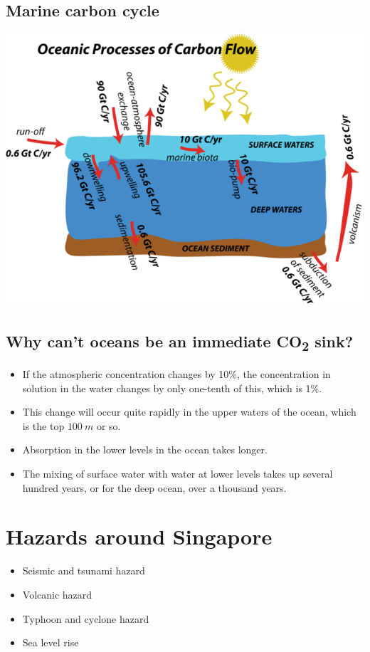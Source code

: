 \documentclass[11pt]{article}
\begin{document}
\subsection{Marine carbon cycle}
\label{sec:org3c55134}
\begin{center}
\includegraphics[width=.9\linewidth]{./images/marine-carbon-cycle.png}
\end{center}
\subsection{Why can't oceans be an immediate CO\textsubscript{2} sink?}
\label{sec:org77112fb}
\begin{itemize}
\item If the atmospheric concentration changes by 10\%, the concentration in solution in the water changes by only one-tenth of this, which is 1\%.
\item This change will occur quite rapidly in the upper waters of the ocean, which is the top \(\qty{100}{m}\) or so.
\item Absorption in the lower levels in the ocean takes longer.
\item The mixing of surface water with water at lower levels takes up several hundred years, or for the deep ocean, over a thousand years.
\end{itemize}
\section{Hazards around Singapore}
\label{sec:org84517c8}
\begin{itemize}
\item Seismic and tsunami hazard
\item Volcanic hazard
\item Typhoon and cyclone hazard
\item Sea level rise
\end{itemize}
\end{document}
